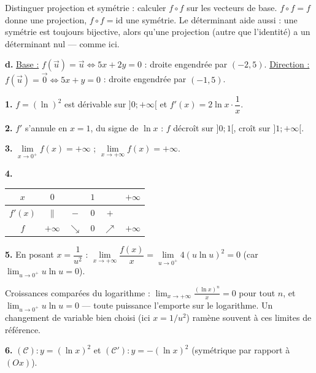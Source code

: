 \documentclass[11pt]{article}
\begin{document}
\begin{methode}
Distinguer projection et symétrie : calculer $f \circ f$ sur les
vecteurs de base. $f \circ f = f$ donne une projection,
$f \circ f = \mathrm{id}$ une symétrie. Le déterminant aide aussi : une
symétrie est toujours bijective, alors qu'une projection (autre que
l'identité) a un déterminant nul — comme ici.
\end{methode}

\textbf{d.} \underline{Base :} $f(\vec{u}) = \vec{u} \Leftrightarrow 5x + 2y = 0$ : droite engendrée par $(-2, 5)$. \underline{Direction :} $f(\vec{u}) = \vec{0} \Leftrightarrow 5x + y = 0$ : droite engendrée par $(-1, 5)$.

\textbf{1.} $f = (\ln)^2$ est dérivable sur $]0;+\infty[$ et $f'(x) = 2\ln x\cdot\dfrac{1}{x}$.

\textbf{2.} $f'$ s'annule en $x = 1$, du signe de $\ln x$ : $f$ décroît sur $]0;1[$, croît sur $]1;+\infty[$.

\textbf{3.} $\lim\limits_{x\to 0^+} f(x) = +\infty$ ; $\lim\limits_{x\to+\infty} f(x) = +\infty$.

\textbf{4.}
\begin{center}\renewcommand{\arraystretch}{1.4}
\begin{tabular}{|c|ccccc|}
\hline $x$ & $0$ & & $1$ & & $+\infty$ \\\hline $f'(x)$ & $\|$ & $-$ & $0$ & $+$ & \\\hline $f$ & $+\infty$ & $\searrow$ & $0$ & $\nearrow$ & $+\infty$ \\\hline
\end{tabular}
\end{center}

\textbf{5.} En posant $x = \dfrac{1}{u^2}$ : $\lim\limits_{x\to+\infty}\dfrac{f(x)}{x} = \lim\limits_{u\to 0^+} 4(u\ln u)^2 = 0$ (car $\lim_{u\to 0^+} u\ln u = 0$).

\begin{rappel}
Croissances comparées du logarithme : $\lim_{x\to+\infty}
\frac{(\ln x)^n}{x} = 0$ pour tout $n$, et $\lim_{u\to 0^+} u\ln u = 0$
— toute puissance l'emporte sur le logarithme. Un changement de
variable bien choisi (ici $x = 1/u^2$) ramène souvent à ces limites de
référence.
\end{rappel}

\textbf{6.} $(\mathcal{C}) : y = (\ln x)^2$ et $(\mathcal{C}') : y = -(\ln x)^2$ (symétrique par rapport à $(Ox)$).
\begin{center}
\end{center}
\end{document}
